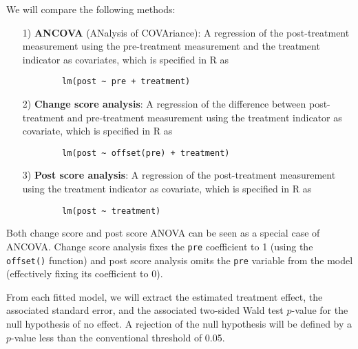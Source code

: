 \documentclass[12pt]{article}
\begin{document}
\begin{examplebox}
We will compare the following methods:
    \begin{itemize}
    \item[1)] \textbf{ANCOVA} (ANalysis of COVAriance): A regression of the post-treatment measurement using the pre-treatment measurement and the treatment indicator as covariates,
    which is specified in R as 
    \begin{verbatim}
        lm(post ~ pre + treatment)
    \end{verbatim}
        
    \item[2)] \textbf{Change score analysis}: A regression of the difference between post-treatment and pre-treatment measurement using the treatment indicator as covariate,
    which is specified in R as 
    \begin{verbatim}
        lm(post ~ offset(pre) + treatment)
    \end{verbatim}
        
    \item[3)] \textbf{Post score analysis}: A regression of the post-treatment measurement using the treatment indicator as covariate,
    which is specified in R as 
    \begin{verbatim}
        lm(post ~ treatment)
    \end{verbatim}
\end{itemize}
Both change score and post score ANOVA can be seen as a special case of ANCOVA. Change score analysis fixes the \texttt{pre} coefficient to 1 (using the \texttt{offset()} function) and post score analysis omits the \texttt{pre} variable from the model (effectively fixing its coefficient to 0).

From each fitted model, we will extract the estimated treatment effect, the associated standard error, and the associated two-sided Wald test $p$-value for the null hypothesis of no effect. A rejection of the null hypothesis will be defined by a $p$-value less than the conventional threshold of 0.05.
\end{examplebox}
\end{document}
